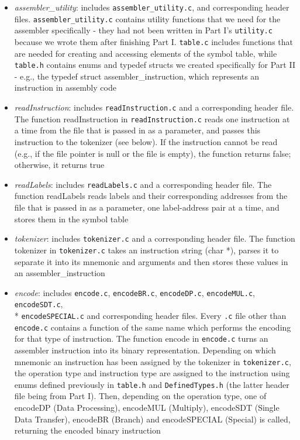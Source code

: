 \documentclass[letterpaper,11pt]{article}
\begin{document}
    \begin{itemize}
        \item \textit{assembler\_utility}: includes \texttt{assembler\_utility.c},  and corresponding header files. \texttt{assembler\_utility.c} contains utility functions that we need for the assembler specifically - they had not been written in Part I's \texttt{utility.c} because we wrote them after finishing Part I. \texttt{table.c} includes functions that are needed for creating and accessing elements of the symbol table, while \texttt{table.h} contains enums and typedef structs we created specifically for Part II - e.g., the typedef struct assembler\_instruction, which represents an instruction in assembly code
        \item \textit{readInstruction}: includes \texttt{readInstruction.c} and a corresponding header file. The function readInstruction in \texttt{readInstruction.c} reads one instruction at a time from the file that is passed in as a parameter, and passes this instruction to the tokenizer (see below). If the instruction cannot be read (e.g., if the file pointer is null or the file is empty), the function returns false; otherwise, it returns true
        \item \textit{readLabels}: includes \texttt{readLabels.c} and a corresponding header file. The function readLabels reads labels and their corresponding addresses from the file that is passed in as a parameter, one label-address pair at a time, and stores them in the symbol table
        \item \textit{tokenizer}: includes \texttt{tokenizer.c} and a corresponding header file. The function tokenizer in \texttt{tokenizer.c} takes an instruction string (char *), parses it to separate it into its mnemonic and arguments and then stores these values in an assembler\_instruction
        \item \textit{encode}: includes \texttt{encode.c}, \texttt{encodeBR.c}, \texttt{encodeDP.c}, \texttt{encodeMUL.c}, \texttt{encodeSDT.c}, \\* \texttt{encodeSPECIAL.c} and corresponding header files. Every \texttt{.c} file other than \texttt{encode.c} contains a function of the same name which performs the encoding for that type of instruction. The function encode in \texttt{encode.c} turns an assembler instruction into its binary representation. Depending on which mnemonic an instruction has been assigned by the tokenizer in \texttt{tokenizer.c}, the operation type and instruction type are assigned to the instruction using enums defined previously in \texttt{table.h} and \texttt{DefinedTypes.h} (the latter header file being from Part I). Then, depending on the operation type, one of encodeDP (Data Processing), encodeMUL (Multiply), encodeSDT (Single Data Transfer), encodeBR (Branch) and encodeSPECIAL (Special) is called, returning the encoded binary instruction

    \end{itemize}
\end{document}
